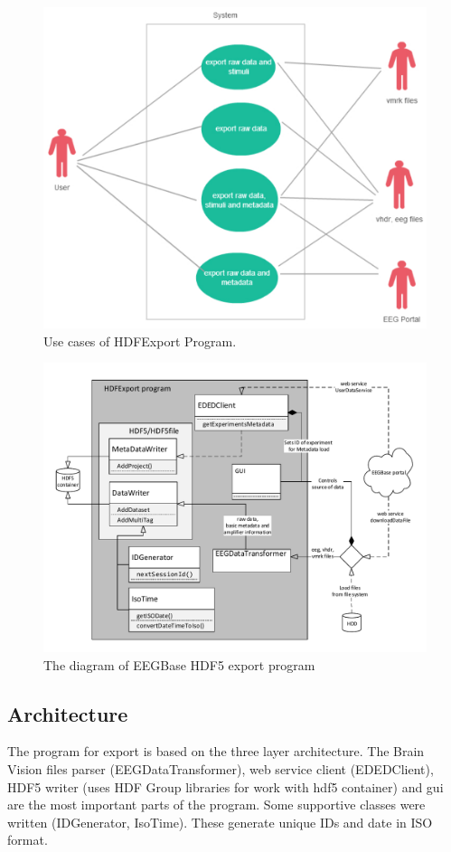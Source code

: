 \begin{figure}
	\includegraphics[scale=0.5]{obrazky/use_case_data.pdf}	
	\caption{Use cases of HDFExport Program.}
	\label{use_case2}
\end{figure}


\begin{figure}[h]
	\includegraphics[scale=0.73]{obrazky/ExportProgramDiagram.pdf}	
	\caption{The diagram of EEGBase HDF5 export program}
	\label{export-diagram}
\end{figure}

\subsection{Architecture}
The program for export is based on the three layer architecture. The Brain Vision files parser (EEGDataTransformer), web service client (EDEDClient), HDF5 writer (uses HDF Group libraries for work with \gls{hdf5} container) and \gls{gui} are the most important parts of the program. Some supportive classes were written (IDGenerator, IsoTime). These generate unique IDs and date in ISO format.



